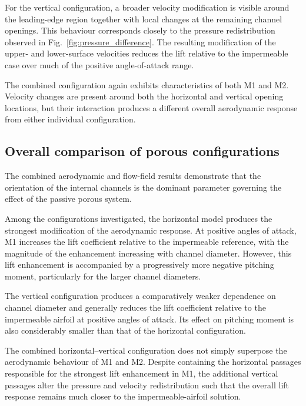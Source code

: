\documentclass[a4paper,fleqn]{cas-dc}
\begin{document}
For the vertical configuration, a broader velocity modification is
visible around the leading-edge region together with local changes at
the remaining channel openings. This behaviour corresponds closely to
the pressure redistribution observed in
Fig.~\ref{fig:pressure_difference}. The resulting modification of the
upper- and lower-surface velocities reduces the lift relative to the
impermeable case over much of the positive angle-of-attack range.

The combined configuration again exhibits characteristics of both M1
and M2. Velocity changes are present around both the horizontal and
vertical opening locations, but their interaction produces a different
overall aerodynamic response from either individual configuration.



\subsection{Overall comparison of porous configurations}
\label{subsec:overall_comparison}

The combined aerodynamic and flow-field results demonstrate that the
orientation of the internal channels is the dominant parameter
governing the effect of the passive porous system.

Among the configurations investigated, the horizontal model produces
the strongest modification of the aerodynamic response. At positive
angles of attack, M1 increases the lift coefficient relative to the
impermeable reference, with the magnitude of the enhancement increasing
with channel diameter. However, this lift enhancement is accompanied by
a progressively more negative pitching moment, particularly for the
larger channel diameters.

The vertical configuration produces a comparatively weaker dependence
on channel diameter and generally reduces the lift coefficient relative
to the impermeable airfoil at positive angles of attack. Its effect on
pitching moment is also considerably smaller than that of the
horizontal configuration.

The combined horizontal--vertical configuration does not simply
superpose the aerodynamic behaviour of M1 and M2. Despite containing
the horizontal passages responsible for the strongest lift enhancement
in M1, the additional vertical passages alter the pressure and velocity
redistribution such that the overall lift response remains much closer
to the impermeable-airfoil solution.
\end{document}
